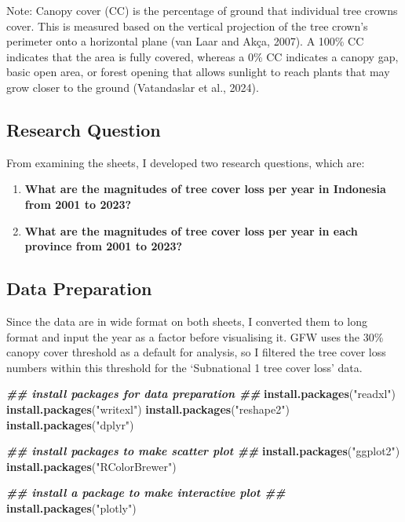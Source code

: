 \documentclass[
]{article}
\newenvironment{Shaded}{\begin{snugshade}}{\end{snugshade}}
\newcommand{\DocumentationTok}[1]{\textcolor[rgb]{0.56,0.35,0.01}{\textbf{\textit{#1}}}}
\newcommand{\FunctionTok}[1]{\textcolor[rgb]{0.13,0.29,0.53}{\textbf{#1}}}
\newcommand{\NormalTok}[1]{#1}
\newcommand{\StringTok}[1]{\textcolor[rgb]{0.31,0.60,0.02}{#1}}
\providecommand{\tightlist}{%
  \setlength{\itemsep}{0pt}\setlength{\parskip}{0pt}}
\begin{document}
Note: Canopy cover (CC) is the percentage of ground that individual tree
crowns cover. This is measured based on the vertical projection of the
tree crown's perimeter onto a horizontal plane (van Laar and Akça,
2007). A 100\% CC indicates that the area is fully covered, whereas a
0\% CC indicates a canopy gap, basic open area, or forest opening that
allows sunlight to reach plants that may grow closer to the ground
(Vatandaslar et al., 2024).

\subsection{Research Question}\label{research-question}

From examining the sheets, I developed two research questions, which
are:

\begin{enumerate}
\def\labelenumi{\arabic{enumi}.}
\tightlist
\item
  \textbf{What are the magnitudes of tree cover loss per year in
  Indonesia from 2001 to 2023?}
\item
  \textbf{What are the magnitudes of tree cover loss per year in each
  province from 2001 to 2023?}
\end{enumerate}

\subsection{Data Preparation}\label{data-preparation}

Since the data are in wide format on both sheets, I converted them to
long format and input the year as a factor before visualising it. GFW
uses the 30\% canopy cover threshold as a default for analysis, so I
filtered the tree cover loss numbers within this threshold for the
`Subnational 1 tree cover loss' data.

\begin{Shaded}
\begin{Highlighting}[]
\DocumentationTok{\#\# install packages for data preparation \#\#}
\FunctionTok{install.packages}\NormalTok{(}\StringTok{"readxl"}\NormalTok{)}
\FunctionTok{install.packages}\NormalTok{(}\StringTok{"writexl"}\NormalTok{)}
\FunctionTok{install.packages}\NormalTok{(}\StringTok{"reshape2"}\NormalTok{)}
\FunctionTok{install.packages}\NormalTok{(}\StringTok{"dplyr"}\NormalTok{)}

\DocumentationTok{\#\# install packages to make scatter plot \#\#}
\FunctionTok{install.packages}\NormalTok{(}\StringTok{"ggplot2"}\NormalTok{)}
\FunctionTok{install.packages}\NormalTok{(}\StringTok{"RColorBrewer"}\NormalTok{)}

\DocumentationTok{\#\# install a package to make interactive plot \#\#}
\FunctionTok{install.packages}\NormalTok{(}\StringTok{"plotly"}\NormalTok{)}
\end{Highlighting}
\end{Shaded}
\end{document}
